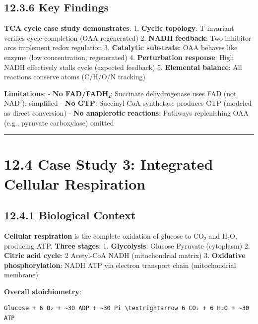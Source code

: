\hypertarget{key-findings-1}{%
\subsection{12.3.6 Key Findings}\label{key-findings-1}}

\textbf{TCA cycle case study demonstrates}: 1. \textbf{Cyclic topology}:
T-invariant verifies cycle completion (OAA regenerated) 2. \textbf{NADH
feedback}: Two inhibitor arcs implement redox regulation 3.
\textbf{Catalytic substrate}: OAA behaves like enzyme (low
concentration, regenerated) 4. \textbf{Perturbation response}: High NADH
effectively stalls cycle (expected feedback) 5. \textbf{Elemental
balance}: All reactions conserve atoms (C/H/O/N tracking)

\textbf{Limitations}: - \textbf{No FAD/FADH₂}: Succinate dehydrogenase
uses FAD (not NAD⁺), simplified - \textbf{No GTP}: Succinyl-CoA
synthetase produces GTP (modeled as direct conversion) - \textbf{No
anaplerotic reactions}: Pathways replenishing OAA (e.g., pyruvate
carboxylase) omitted

\begin{center}\rule{0.5\linewidth}{0.5pt}\end{center}

\hypertarget{case-study-3-integrated-cellular-respiration}{%
\section{12.4 Case Study 3: Integrated Cellular
Respiration}\label{case-study-3-integrated-cellular-respiration}}

\hypertarget{biological-context-2}{%
\subsection{12.4.1 Biological Context}\label{biological-context-2}}

\textbf{Cellular respiration} is the complete oxidation of glucose to
CO₂ and H₂O, producing ATP. \textbf{Three stages}: 1.
\textbf{Glycolysis}: Glucose  Pyruvate (cytoplasm) 2. \textbf{Citric
acid cycle}: 2 Acetyl-CoA  NADH (mitochondrial matrix) 3.
\textbf{Oxidative phosphorylation}: NADH \textrightarrow ATP via electron transport
chain (mitochondrial membrane)

\textbf{Overall stoichiometry}:

\begin{lstlisting}
Glucose + 6 O₂ + ~30 ADP + ~30 Pi \textrightarrow 6 CO₂ + 6 H₂O + ~30 ATP
\end{lstlisting}

